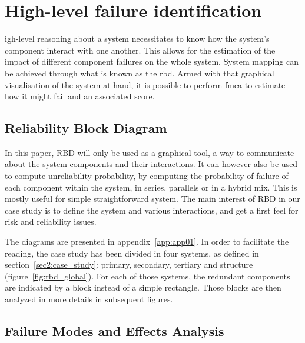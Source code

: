%
%
\let\textcircled=\pgftextcircled
\chapter{High-level failure identification}
\label{chap:rbd_fmea}


igh-level reasoning about a system necessitates to know how the system's component interact with one another. This allows for the estimation of the impact of different component failures on the whole system. System mapping can be achieved through what is known as the \gls{rbd}. Armed with that graphical visualisation of the system at hand, it is possible to perform \gls{fmea} to estimate how it might fail and an associated score.

\section{Reliability Block Diagram}
\label{sec:rbd}

In this paper, RBD will only be used as a graphical tool, a way to communicate about the system components and their interactions. It can however also be used to compute unreliability probability, by computing the probability of failure of each component within the system, in series, parallels or in a hybrid mix. This is mostly useful for simple straightforward system. The main interest of RBD in our case study is to define the system and various interactions, and get a first feel for risk and reliability issues.

The diagrams are presented in appendix~\ref{app:app01}. In order to facilitate the reading, the case study has been divided in four systems, as defined in section~\ref{sec2:case_study}: primary, secondary, tertiary and structure (figure~\ref{fig:rbd_global}). For each of those systems, the redundant components are indicated by a block instead of a simple rectangle. Those blocks are then analyzed in more details in subsequent figures.


\section{Failure Modes and Effects Analysis}
\label{sec:fmea}


